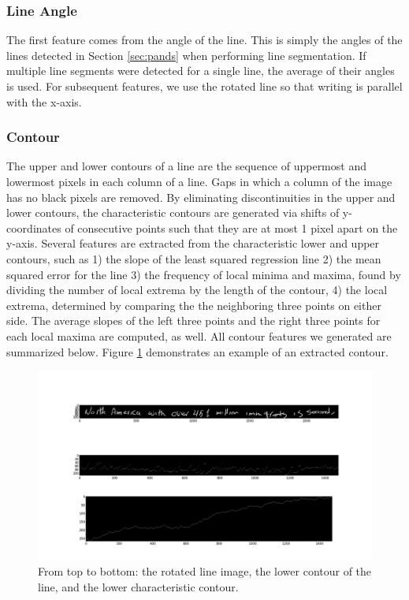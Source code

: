 \documentclass[paper=a4, fontsize=11pt]{scrartcl} %
\numberwithin{equation}{section} %
\numberwithin{figure}{section} %
\numberwithin{table}{section} %
\begin{document}
\subsubsection{Line Angle}
The first feature comes from the angle of the line. This is simply the
angles of the lines detected in Section \ref{sec:pands} when
performing line segmentation. If multiple line segments were detected
for a single line, the average of their angles is used. For subsequent
features, we use the rotated line so that writing is parallel with the
x-axis.

\subsubsection{Contour}
The upper and lower contours of a line are the sequence of uppermost
and lowermost pixels in each column of a line. Gaps in which a column
of the image has no black pixels are removed. By eliminating
discontinuities in the upper and lower contours, the characteristic
contours are generated via shifts of y-coordinates of consecutive
points such that they are at most 1 pixel apart on the y-axis. Several
features are extracted from the characteristic lower and upper
contours, such as 1) the slope of the least squared regression line 2)
the mean squared error for the line 3) the frequency of local minima
and maxima, found by dividing the number of local extrema by the
length of the contour, 4) the local extrema, determined by comparing
the the neighboring three points on either side. The average slopes of
the left three points and the right three points for each local maxima
are computed, as well.  All contour features we generated are
summarized below. Figure \ref{fig:contourimage} demonstrates an
example of an extracted contour.

\begin{figure}
  \centering \includegraphics{contourimage.png}
  \caption{From top to bottom: the rotated line image, the lower
    contour of the line, and the lower characteristic contour.}
  \label{fig:contourimage}
\end{figure}
\end{document}
